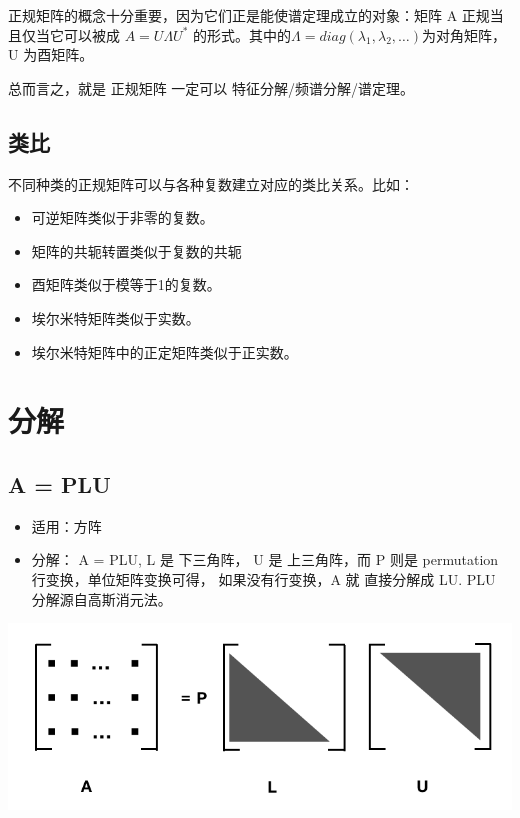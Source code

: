 \documentclass[
]{book}
\providecommand{\tightlist}{%
  \setlength{\itemsep}{0pt}\setlength{\parskip}{0pt}}
\begin{document}
正规矩阵的概念十分重要，因为它们正是能使谱定理成立的对象：矩阵 A 正规当且仅当它可以被成 \(A = U \Lambda U^*\) 的形式。其中的\(\Lambda = diag(\lambda_1, \lambda_2, \dots)\)为对角矩阵，U 为酉矩阵。

总而言之，就是 正规矩阵 一定可以 特征分解/频谱分解/谱定理。

\hypertarget{ux7c7bux6bd4}{%
\subsection{类比}\label{ux7c7bux6bd4}}

不同种类的正规矩阵可以与各种复数建立对应的类比关系。比如：

\begin{itemize}
\tightlist
\item
  可逆矩阵类似于非零的复数。
\item
  矩阵的共轭转置类似于复数的共轭
\item
  酉矩阵类似于模等于1的复数。
\item
  埃尔米特矩阵类似于实数。
\item
  埃尔米特矩阵中的正定矩阵类似于正实数。
\end{itemize}

\hypertarget{ux5206ux89e3}{%
\section{分解}\label{ux5206ux89e3}}

\hypertarget{a-plu}{%
\subsection{A = PLU}\label{a-plu}}

\begin{itemize}
\tightlist
\item
  适用：方阵
\item
  分解： A = PLU, L 是 下三角阵， U 是 上三角阵，而 P 则是 permutation 行变换，单位矩阵变换可得， 如果没有行变换，A 就 直接分解成 LU. PLU 分解源自高斯消元法。
\end{itemize}

\includegraphics{images/Gauss_03_APLU.png}
\end{document}
